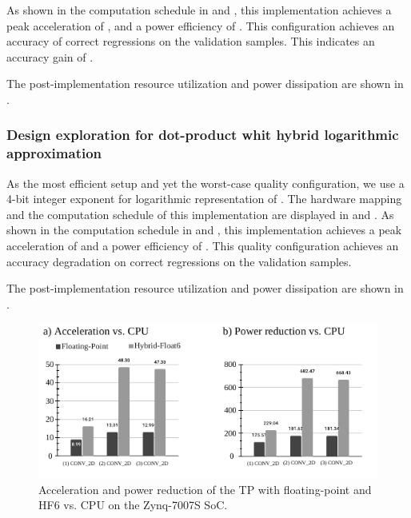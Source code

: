 As shown in the computation schedule in  and , this implementation achieves a peak acceleration of , and a power efficiency of . This configuration achieves an accuracy of  correct regressions on the  validation samples. This indicates an accuracy gain of .

The post-implementation resource utilization and power dissipation are shown in .


\subsubsection{Design exploration for dot-product whit hybrid logarithmic approximation}
As the most efficient setup and yet the worst-case quality configuration, we use a 4-bit integer exponent for logarithmic representation of . The hardware mapping and the computation schedule of this implementation are displayed in  and . As shown in the computation schedule in  and , this implementation achieves a peak acceleration of  and a power efficiency of . This quality configuration achieves an accuracy degradation  on correct regressions on the  validation samples.

The post-implementation resource utilization and power dissipation are shown in .

\begin{figure}[t!]
	\centering
	\includegraphics[width=1\columnwidth]{../figures/power_breakdown/acceleration_power_reduction.pdf}
	\caption{Acceleration and power reduction of the TP with floating-point and HF6 vs. CPU on the Zynq-7007S SoC.}
	\label{fig:ACCELERATION}
\end{figure}

